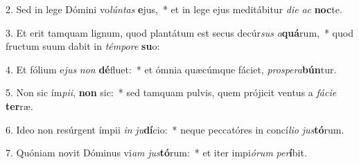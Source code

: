 2. Sed in lege Dómini vo\textit{lún}\textit{tas} \textbf{e}jus,~*  et in lege ejus meditábitur \textit{di}\textit{e} \textit{ac} \textbf{noc}te.\

3. Et erit tamquam lignum, quod plantátum est secus decúr\textit{sus} \textit{a}\textbf{quá}rum,~*  quod fructum suum dabit in \textit{tém}\textit{po}\textit{re} \textbf{su}o:\

4. Et fólium e\textit{jus} \textit{non} \textbf{dé}fluet:~*  et ómnia quæcúmque fáciet, \textit{pro}\textit{spe}\textit{ra}\textbf{bún}tur.\

5. Non sic ím\textit{pi}\textit{i}, \textbf{non} sic:~*  sed tamquam pulvis, quem prójicit ventus a \textit{fá}\textit{ci}\textit{e} \textbf{ter}ræ.\

6. Ideo non resúrgent ímpii \textit{in} \textit{ju}\textbf{dí}cio:~*  neque peccatóres in concí\textit{li}\textit{o} \textit{jus}\textbf{tó}rum.\

7. Quóniam novit Dóminus vi\textit{am} \textit{jus}\textbf{tó}rum:~*  et iter impi\textit{ó}\textit{rum} \textit{per}\textbf{í}bit.\

